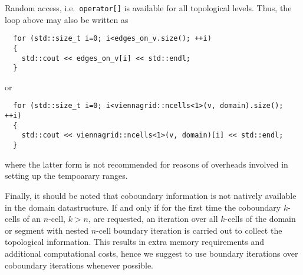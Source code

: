 Random access, i.e.~\lstinline|operator[]| is available for all topological levels. Thus, the loop above may also be written as
\begin{lstlisting}
  for (std::size_t i=0; i<edges_on_v.size(); ++i)
  {
    std::cout << edges_on_v[i] << std::endl;
  }
\end{lstlisting}
or 
\begin{lstlisting}
  for (std::size_t i=0; i<viennagrid::ncells<1>(v, domain).size(); ++i)
  {
    std::cout << viennagrid::ncells<1>(v, domain)[i] << std::endl;
  }
\end{lstlisting}
where the latter form is not recommended for reasons of overheads involved in setting up the tempoarary ranges.

Finally, it should be noted that coboundary information is not natively available in the domain datastructure. If and only if for the first time
the coboundary $k$-cells of an $n$-cell, $k>n$, are requested, an iteration over all $k$-cells of the domain or segment with nested $n$-cell boundary iteration is carried out to collect the topological information.
This results in extra memory requirements and additional computational costs, hence we suggest to use boundary iterations over coboundary iterations whenever possible.





